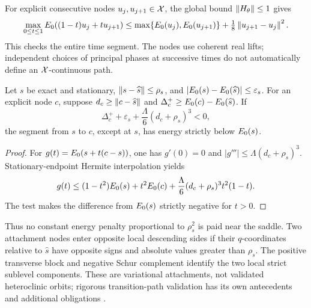 For explicit consecutive nodes $u_j,u_{j+1}\in\mathcal X$, the global bound
$\left\lVert H_\theta\right\rVert\le1$ gives
\begin{equation}\label{eq:cert-segment-test}
 \max_{0\le t\le1}E_0((1-t)u_j+tu_{j+1})
 \le\max\{E_0(u_j),E_0(u_{j+1})\}
             +\tfrac18\left\lVert u_{j+1}-u_j\right\rVert^2.
\end{equation}
This checks the entire time segment. The nodes use coherent real lifts;
independent choices of principal phases at successive times do not
automatically define an $\mathcal X$-continuous path.

\begin{lemma}\label{lem:cert-hermite}
Let $s$ be exact and stationary, $\left\lVert s-\widehat s\right\rVert\le\rho_s$, and
$|E_0(s)-E_0(\widehat s)|\le\varepsilon_s$. For an explicit node $c$,
suppose $d_c\ge\left\lVert c-\widehat s\right\rVert$ and
$\Delta_c^+\ge E_0(c)-E_0(\widehat s)$. If
\begin{equation}\label{eq:cert-hermite-test}
 \Delta_c^++\varepsilon_s+\frac\Lambda6(d_c+\rho_s)^3<0,
\end{equation}
the segment from $s$ to $c$, except at $s$, has energy strictly below
$E_0(s)$.
\end{lemma}
\begin{proof}
For $g(t)=E_0(s+t(c-s))$, one has $g'(0)=0$ and
$|g'''|\le\Lambda(d_c+\rho_s)^3$. Stationary-endpoint Hermite
interpolation yields
\[
 g(t)\le(1-t^2)E_0(s)+t^2E_0(c)
       +\frac\Lambda6(d_c+\rho_s)^3t^2(1-t).
\]
The test makes the difference from $E_0(s)$ strictly negative for $t>0$.
\end{proof}

Thus no constant energy penalty proportional to $\rho_s^2$ is paid near
the saddle. Two attachment nodes enter opposite local descending sides
if their $q$-coordinates relative to $\widehat s$ have opposite signs
and absolute values greater than $\rho_s$. The positive transverse
block and negative Schur complement identify the two local strict
sublevel components. These are variational attachments, not validated
heteroclinic orbits; rigorous transition-path validation has its own
antecedents and additional obligations \cite{Breden2019}.

